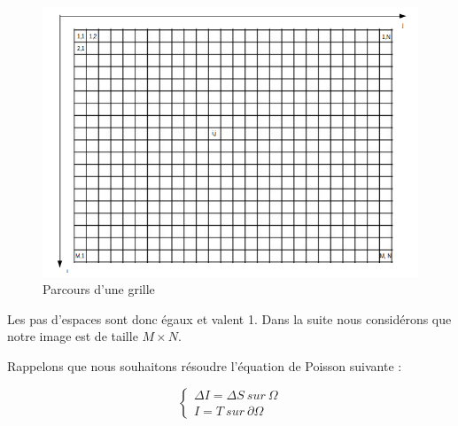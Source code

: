 	\begin{figure}[!htb]
	\centering
	\includegraphics[scale=0.3]{Images/grille.png}
	\caption{Parcours d'une grille}
	\end{figure}
Les pas d'espaces sont donc égaux et valent 1. Dans la suite nous considérons que notre image est de taille $M \times N$.
\newpage

Rappelons que nous souhaitons résoudre l'équation de Poisson suivante : 
\begin{center}
\begin{equation*}
    \left \{
    \begin{aligned}
    \Delta I = \Delta S \ sur \ \Omega\\
    I = T \ sur \ \partial \Omega
    \end{aligned}
    \right.
\end{equation*}
\end{center}